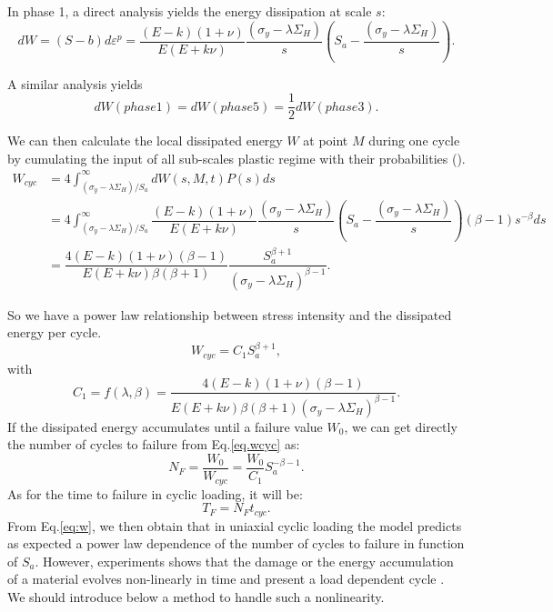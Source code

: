\documentclass[3p,times,procedia,number]{elsarticle}
\begin{document}
In phase 1, a direct analysis yields the energy dissipation at scale $s$:
\begin{equation}dW=(S-b)d\varepsilon^p=\dfrac{(E-k)(1+\nu) }{E(E+k\nu)}\dfrac{ \left(\sigma_y-\lambda \Sigma_H\right)}{s}\left(S_{a}-\dfrac{ \left(\sigma_y-\lambda \Sigma_H\right)}{s}\right).
\label{dw}
\end{equation}

A similar analysis yields $$dW(phase 1)=dW(phase 5)=\dfrac{1}{2}dW(phase 3).$$

We can then calculate  the local dissipated energy $W$  at point $M$ during one cycle by cumulating the input of all sub-scales plastic regime with their probabilities (\cite{zepeng}).
\begin{equation}
\begin{split}
W_{cyc}&=4\int_{ \left(\sigma_y-\lambda \Sigma_H\right) /S_{a}}^{\infty}dW(s,M,t)P(s)ds
\\&=4\int_{ \left(\sigma_y-\lambda \Sigma_H\right) /S_{a}}^{\infty}\dfrac{(E-k)(1+\nu) }{E(E+k\nu)}\dfrac{ \left(\sigma_y-\lambda \Sigma_H\right)}{s}\left(S_{a}-\dfrac{ \left(\sigma_y-\lambda \Sigma_H\right)}{s}\right)\left( \beta-1\right) s^{-\beta}ds
\\&=\dfrac{4(E-k)(1+\nu)\left( \beta-1\right) }{ E(E+k\nu)\beta\left( \beta+1\right) }\dfrac{S_{a}^{\beta+1}}{ \left(\sigma_y-\lambda \Sigma_H\right)^{\beta-1}}.
\end{split}
\label{eq:w}
\end{equation}

So we have a power law relationship between stress intensity and the dissipated energy per cycle.
\begin{equation}
W_{cyc}=C_1S_{a}^{\beta+1},
\label{eq.wcyc}
\end{equation}
with 
$$C_1=f(\lambda,\beta)=\dfrac{4(E-k)(1+\nu)\left( \beta-1\right) }{ E(E+k\nu)\beta\left( \beta+1\right)\left(\sigma_y-\lambda \Sigma_H\right)^{\beta-1} }.$$
If the dissipated energy accumulates until a failure value $W_0$, we can get directly the number of cycles to failure from Eq.\eqref{eq.wcyc} as:
\begin{equation}
N_{F}=\dfrac{W_0}{W_{cyc}}=\dfrac{W_0}{C_1}S_{a}^{-\beta-1}.
\label{eq.NFcyc}
\end{equation}
As for the time to failure in cyclic loading, it will be:
$$T_{F}=N_{F}t_{cyc}.$$
From Eq.\eqref{eq:w}, we then obtain that in uniaxial cyclic loading the model predicts as expected a power law dependence of the number of cycles to failure in function of $S_{a}$.
However, experiments shows that the damage or the energy accumulation of a material evolves non-linearly in time and present a load dependent cycle . We should introduce below a method to handle such a nonlinearity.
\end{document}

